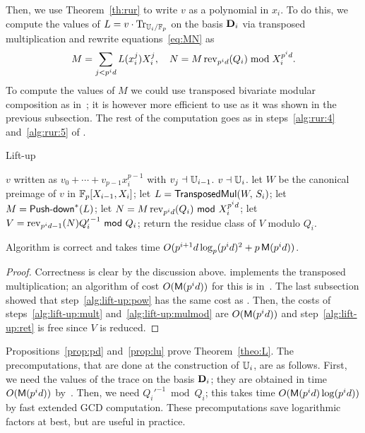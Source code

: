 Then, we use Theorem~\ref{th:rur} to write $v$ as a polynomial in
$x_i$. To do this, we compute the values of $L=v\cdot\operatorname{Tr}_{\mathbb{U}_i/\mathbb{F}_p}$
on the basis $\mathbf{D}_i$ via transposed multiplication and rewrite
equations~\eqref{eq:MN} as
\begin{equation}
  \label{eq:MNliftup}
  M = \sum_{j < p^id}L(x_i^j)X_i^j,\quad N = M\operatorname{rev}_{p^id}(Q_i) \bmod X_i^{p^id}.
\end{equation}
To compute the values of $M$ we could use transposed bivariate modular
composition as in~\cite{shoup99}; it is however more efficient to use
 as it was shown in the previous subsection. The
rest of the computation goes as in steps~\ref{alg:rur:4}
and~\ref{alg:rur:5} of .

\begin{algorithm}
  \caption{Lift-up}
  \begin{algorithmic}[1]
    \REQUIRE $v$ written as $v_0+\cdots+v_{p-1}x_i^{p-1}$ with $v_j \dashv \mathbb{U}_{i-1}$.
    \ENSURE $v\dashv \mathbb{U}_i$.
    \STATE let $W$ be the canonical preimage of $v$ in $\mathbb{F}_p[X_{i-1},X_i]$;
    \STATE \label{alg:lift-up:transmul} let $L = {\sf TransposedMul}(W,\,S_i)$;
    \STATE \label{alg:lift-up:pow} let $M={\text{\sf Push-down}}^\ast(L)$;
    \STATE \label{alg:lift-up:mult} let $N = M \operatorname{rev}_{p^id}(Q_i) {\sf ~mod~} X_i^{p^id}$;
    \STATE \label{alg:lift-up:mulmod} let $V=\operatorname{rev}_{p^id-1}(N) {Q_i'}^{-1} {\sf ~mod~} Q_i$;
    \STATE \label{alg:lift-up:ret} return the residue class of $V$ modulo $Q_i$.
  \end{algorithmic}
\end{algorithm}

\begin{proposition}\label{prop:lu}
 Algorithm  is correct and takes time $O(p^{i+1}d\log_p(p^id)^2+p\,\mathsf{M}(p^{i}d))$.
\end{proposition}
\begin{proof}
  Correctness is clear by the discussion above. 
  implements the transposed multiplication; an algorithm of cost
  $O(\mathsf{M}(p^id))$ for this is in~\cite[Corollary~2]{pascal+schost06}.
  The last subsection showed that step~\ref{alg:lift-up:pow} has the
  same cost as . Then, the costs of
  steps~\ref{alg:lift-up:mult} and~\ref{alg:lift-up:mulmod} are
  $O(\mathsf{M}(p^id))$ and step~\ref{alg:lift-up:ret} is free since $V$ is
  reduced.
\end{proof}


Propositions~\ref{prop:pd} and~\ref{prop:lu} prove
Theorem~\ref{theo:L}. The precomputations, that are done at the
construction of $\mathbb{U}_i$, are as follows. First, we need the values of
the trace on the basis $\mathbf{D}_i$; they are obtained in time
$O(\mathsf{M}(p^id))$ by~\todo. Then, we need ${Q_i'}^{-1} \bmod Q_i$; this
takes time $O(\mathsf{M}(p^id) \log(p^id))$ by fast extended GCD
computation.  These precomputations save logarithmic factors at best,
but are useful in practice.



%
